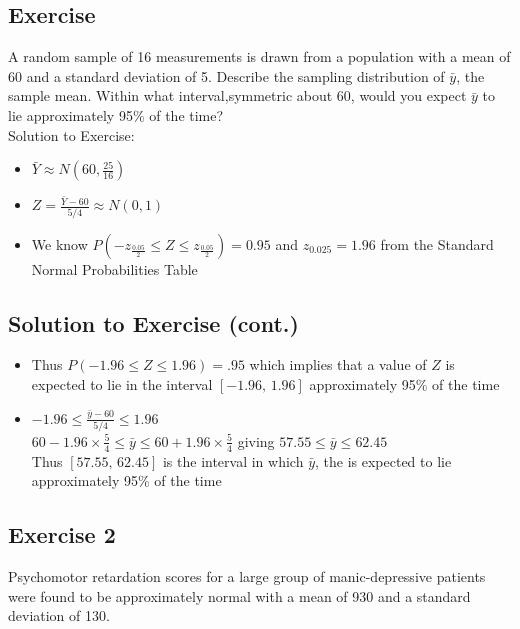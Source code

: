 \documentclass[
  letterpaper,
  DIV=11,
  numbers=noendperiod]{scrartcl}
\begin{document}
\subsection{Exercise}\label{exercise}

A random sample of 16 measurements is drawn from a population with a
mean of 60 and a standard deviation of 5. Describe the sampling
distribution of \(\bar{y}\), the sample mean. Within what
interval,symmetric about 60, would you expect \(\bar{y}\) to lie
approximately 95\% of the time?\\
Solution to Exercise:

\begin{itemize}
\item
  \(\bar{Y} \approx N(60, \frac{25}{16})\)
\item
  \(Z = \frac{\bar{Y}-60}{5/4} \approx N(0,1)\)
\item
  We know \(P(-z_{\frac{0.05}{2}} \leq Z \leq z_{\frac{0.05}{2}}) =
           0.95\) and \(z_{0.025} = 1.96\) from the Standard Normal
  Probabilities Table
\end{itemize}

\subsection{Solution to Exercise
(cont.)}\label{solution-to-exercise-cont.}

\begin{itemize}
\item
  Thus \(P(-1.96 \leq Z \leq 1.96) =.95\) which implies that a value of
  \(Z\) is {expected} to lie in the interval \([-1.96, \, 1.96]\)
  approximately 95\% of the time
\item
  \(-1.96 \leq \frac{\bar{y}-60}{5/4} \leq 1.96\)\\
  \(60 - 1.96 \times \frac54 \leq \bar{y} \leq 60 +
               1.96 \times \frac54\) giving
  \(57.55 \leq \bar{y} \leq 62.45\)\\
  Thus \([57.55, \, 62.45]\) is the interval in which \(\bar{y}\), the
  is {expected} to lie approximately 95\% of the time
\end{itemize}

\subsection{Exercise 2}\label{exercise-2}

Psychomotor retardation scores for a large group of manic-depressive
patients were found to be approximately normal with a mean of 930 and a
standard deviation of 130.
\end{document}
